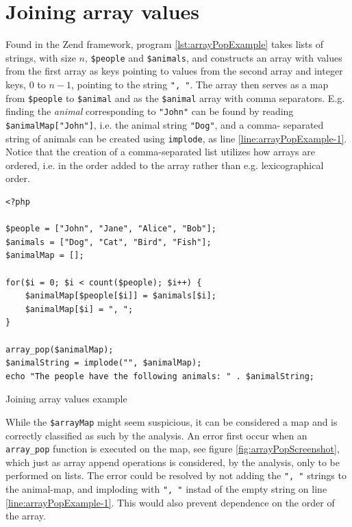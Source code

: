 \newpage
\section{Joining array values}
Found in the Zend framework, program \ref{lst:arrayPopExample} takes lists of strings, with 
size $n$, \texttt{\$people} and \texttt{\$animals}, and constructs an array with values from 
the first array as keys pointing to values from the second array and integer keys, $0$ to 
$n-1$, pointing to the string \texttt{", "}. The array then serves as a map from 
\texttt{\$people} to \texttt{\$animal} and as the \texttt{\$animal} array with comma 
separators. E.g. finding the \textit{animal} corresponding to \texttt{"John"} can be found by 
reading \texttt{\$animalMap["John"]}, i.e. the animal string \texttt{"Dog"}, and a comma-
separated string of animals can be created using \texttt{implode}, as line 
\ref{line:arrayPopExample-1}. Notice that the creation of a comma-separated list utilizes how 
arrays are ordered, i.e. in the order added to the array rather than e.g. lexicographical 
order. 

\begin{program}
\begin{lstlisting}
<?php

$people = ["John", "Jane", "Alice", "Bob"];
$animals = ["Dog", "Cat", "Bird", "Fish"];
$animalMap = [];

for($i = 0; $i < count($people); $i++) {
    $animalMap[$people[$i]] = $animals[$i];
    $animalMap[$i] = ", ";
}

array_pop($animalMap);
$animalString = implode("", $animalMap);
echo "The people have the following animals: " . $animalString;
\end{lstlisting}
\caption{Joining array values example}
\label{lst:arrayPopExample}
\end{program}


While the \texttt{\$arrayMap} might seem suspicious, it can be considered a map and is 
correctly classified as such by the analysis. An error first occur when an 
\texttt{array\_pop} function is executed on the map, see figure \ref{fig:arrayPopScreenshot}, which just as 
array append operations is considered, by the analysis, only to be performed on lists. The error could be 
resolved by not adding the \texttt{", "} strings to the animal-map, and imploding with \texttt{", "} instad of the empty string on line \ref{line:arrayPopExample-1}. This would also prevent dependence on the order of the array.

